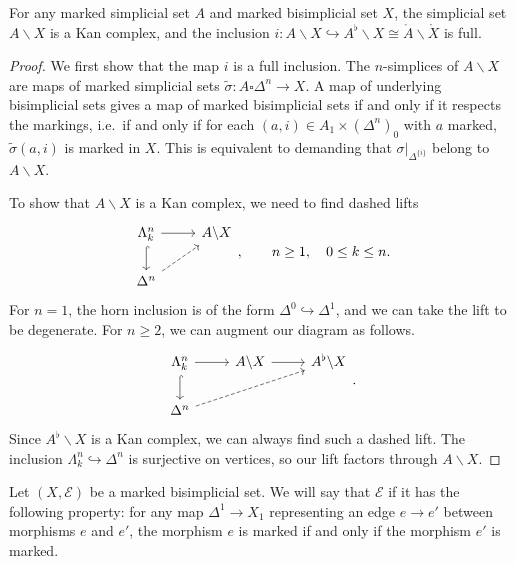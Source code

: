 \documentclass[main.tex]{subfiles}
\begin{document}
\begin{lemma}
  For any marked simplicial set $A$ and marked bisimplicial set $X$, the simplicial set $A \backslash X$ is a Kan complex, and the inclusion $i\colon A \backslash X \hookrightarrow A^{\flat} \backslash X \cong \mathring{A} \backslash \mathring{X}$ is full.
\end{lemma}
\begin{proof}
  We first show that the map $i$ is a full inclusion. The $n$-simplices of $A \backslash X$ are maps of marked simplicial sets $\tilde{\sigma}\colon A \square \Delta^{n} \to X$. A map of underlying bisimplicial sets gives a map of marked bisimplicial sets if and only if it respects the markings, i.e.\ if and only if for each $(a, i) \in A_{1} \times (\Delta^{n})_{0}$ with $a$ marked, $\tilde{\sigma}(a, i)$ is marked in $X$. This is equivalent to demanding that $\sigma|_{\Delta^{\{i\}}}$ belong to $A \backslash X$.

  To show that $A \backslash X$ is a Kan complex, we need to find dashed lifts
  \begin{equation*}
    \begin{tikzcd}
      \Lambda^{n}_{k}
      \arrow[r]
      \arrow[d, hook]
      & A \backslash X
      \\
      \Delta^{n}
      \arrow[ur, dashed]
    \end{tikzcd},
    \qquad n \geq 1,\quad 0 \leq k \leq n.
  \end{equation*}
  For $n = 1$, the horn inclusion is of the form $\Delta^{0} \hookrightarrow \Delta^{1}$, and we can take the lift to be degenerate. For $n \geq 2$, we can augment our diagram as follows.
  \begin{equation*}
    \begin{tikzcd}
      \Lambda^{n}_{k}
      \arrow[r]
      \arrow[d, hook]
      & A \backslash X
      \arrow[r]
      & A^{\flat} \backslash X
      \\
      \Delta^{n}
      \arrow[urr, dashed]
    \end{tikzcd}.
  \end{equation*}
  Since $A^{\flat} \backslash X$ is a Kan complex, we can always find such a dashed lift. The inclusion $\Lambda^{n}_{k} \hookrightarrow \Delta^{n}$ is surjective on vertices, so our lift factors through $A \backslash X$.
\end{proof}

\begin{definition}
  \label{def:respects_path_components}
  Let $(X, \mathcal{E})$ be a marked bisimplicial set. We will say that $\mathcal{E}$  if it has the following property: for any map $\Delta^{1} \to X_{1}$ representing an edge $e \to e'$ between morphisms $e$ and $e'$, the morphism $e$ is marked if and only if the morphism $e'$ is marked.
\end{definition}
\end{document}
